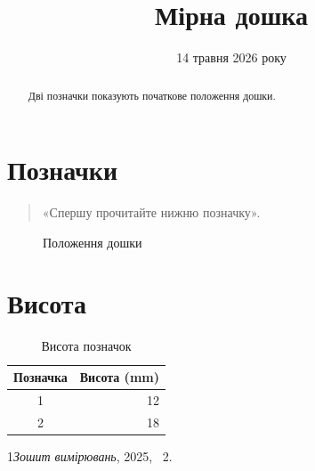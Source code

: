 \documentclass{article}
\begin{document}
\title{Мірна дошка}\author{}\date{14 травня 2026 року}\maketitle
\begin{abstract}Дві позначки показують початкове положення дошки.\end{abstract}
\tableofcontents
\section{Позначки}\begin{quote}«Спершу прочитайте нижню позначку».\end{quote}
\begin{figure}[ht]\centering\fbox{\rule{0pt}{8mm}\rule{33mm}{0pt}}\caption{Положення дошки}\end{figure}
\section{Висота}
\begin{table}[ht]\centering\begin{tabular}{cr}Позначка&Висота (mm)\\\hline 1&12\\2&18\end{tabular}\caption{Висота позначок}\end{table}
\begin{thebibliography}{1}\emph{Зошит вимірювань}, 2025, \chaptername~2.\end{thebibliography}
\end{document}
